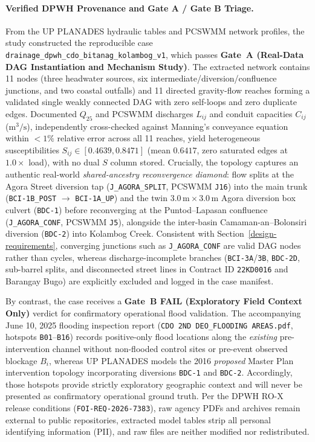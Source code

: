 \paragraph{Verified DPWH Provenance and Gate A / Gate B Triage.}
From the UP PLANADES hydraulic tables and PCSWMM network profiles, the study
constructed the reproducible case
\texttt{drainage\_\allowbreak dpwh\_\allowbreak cdo\_\allowbreak bitanag\_\allowbreak kolambog\_v1},
which passes \textbf{Gate~A (Real-Data DAG Instantiation and Mechanism Study)}.
The extracted network contains 11 nodes (three headwater sources, six
intermediate/diversion/confluence junctions, and two coastal outfalls) and 11
directed gravity-flow reaches forming a validated single weakly connected DAG
with zero self-loops and zero duplicate edges. Documented $Q_{25}$ and PCSWMM
discharges $L_{ij}$ and conduit capacities $C_{ij}$ ($\mathrm{m}^3/\mathrm{s}$),
independently cross-checked against Manning's conveyance equation within
$<1\%$ relative error across all 11 reaches, yield heterogeneous
susceptibilities $S_{ij}\in[0.4639,0.8471]$ (mean $0.6417$, zero saturated
edges at $1.0\times$ load), with no dual $S$ column stored. Crucially, the
topology captures an authentic real-world \emph{shared-ancestry reconvergence
diamond}: flow splits at the Agora Street diversion tap
(\texttt{J\_\allowbreak AGORA\_\allowbreak SPLIT}, PCSWMM \texttt{J16}) into
the main trunk (\texttt{BCI-1B\_\allowbreak POST} $\to$
\texttt{BCI-1A\_\allowbreak UP}) and the twin $3.0\,\mathrm{m}\times 3.0\,\mathrm{m}$
Agora diversion box culvert (\texttt{BDC-1}) before reconverging at the
Puntod--Lapasan confluence (\texttt{J\_\allowbreak AGORA\_\allowbreak CONF},
PCSWMM \texttt{J5}), alongside the inter-basin Camaman-an--Bolonsiri diversion
(\texttt{BDC-2}) into Kolambog Creek. Consistent with Section~\ref{design-requirements},
converging junctions such as \texttt{J\_\allowbreak AGORA\_\allowbreak CONF}
are valid DAG nodes rather than cycles, whereas discharge-incomplete branches
(\texttt{BCI-3A}/\texttt{3B}, \texttt{BDC-2D}, sub-barrel splits, and
disconnected street lines in Contract ID \texttt{22KD0016} and Barangay Bugo)
are explicitly excluded and logged in the case manifest.

By contrast, the case receives a \textbf{Gate~B FAIL (Exploratory Field
Context Only)} verdict for confirmatory operational flood validation. The
accompanying June 10, 2025 flooding inspection report
(\texttt{CDO 2ND DEO\_\allowbreak FLOODING AREAS.pdf}, hotspots
\texttt{B01}--\texttt{B16}) \citep{dpwh2026foi} records positive-only flood
locations along the \emph{existing} pre-intervention channel without
non-flooded control sites or pre-event observed blockage $B_i$, whereas UP
PLANADES models the 2016 \emph{proposed} Master Plan intervention topology
incorporating diversions \texttt{BDC-1} and \texttt{BDC-2}. Accordingly, those
hotspots provide strictly exploratory geographic context and will never be
presented as confirmatory operational ground truth. Per the DPWH RO-X release
conditions (\texttt{FOI-REQ-2026-7383}), raw agency PDFs and archives remain
external to public repositories, extracted model tables strip all personal
identifying information (PII), and raw files are neither modified nor
redistributed.


